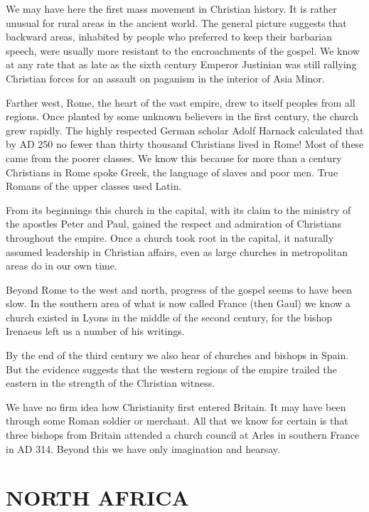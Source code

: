 We may have here the first mass movement in Christian history. It is rather unusual for rural areas
in the ancient world. The general picture suggests that backward areas, inhabited by people who
preferred to keep their barbarian speech, were usually more resistant to the encroachments of the
gospel. We know at any rate that as late as the sixth century Emperor Justinian was still rallying
Christian forces for an assault on paganism in the interior of Asia Minor.

Farther west, Rome, the heart of the vast empire, drew to itself peoples from all regions. Once
planted by some unknown believers in the first century, the church grew rapidly. The highly
respected German scholar Adolf Harnack calculated that by AD 250 no fewer than thirty thousand
Christians lived in Rome! Most of these came from the poorer classes. We know this because for more
than a century Christians in Rome spoke Greek, the language of slaves and poor men. True Romans of
the upper classes used Latin.

From its beginnings this church in the capital, with its claim to the ministry of the apostles Peter
and Paul, gained the respect and admiration of Christians throughout the empire. Once a church took
root in the capital, it naturally assumed leadership in Christian affairs, even as large churches in
metropolitan areas do in our own time.

Beyond Rome to the west and north, progress of the gospel seems to have been slow. In the southern
area of what is now called France (then Gaul) we know a church existed in Lyons in the middle of the
second century, for the bishop Irenaeus left us a number of his writings.

By the end of the third century we also hear of churches and bishops in Spain. But the evidence
suggests that the western regions of the empire trailed the eastern in the strength of the Christian
witness.

We have no firm idea how Christianity first entered Britain. It may have been through some Roman
soldier or merchant. All that we know for certain is that three bishops from Britain attended a
church council at Arles in southern France in AD 314. Beyond this we have only imagination and
hearsay.

\section{NORTH AFRICA}

